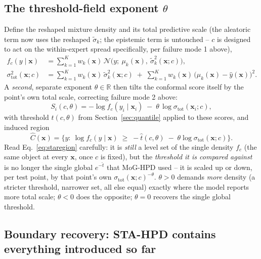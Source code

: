 \documentclass[11pt]{article}
\begin{document}
\subsection{The threshold-field exponent $\theta$}
\label{sec:theta}

Define the reshaped mixture density and its total predictive scale (the aleatoric term now uses
the reshaped $\tilde\sigma_k$; the epistemic term is untouched -- $c$ is designed to act on the
within-expert spread specifically, per failure mode 1 above),
\begin{align}
f_c(y\mid\bm x) &= \sum_{k=1}^K w_k(\bm x)\,\mathcal N\big(y;\ \mu_k(\bm x),\
\tilde\sigma_k^2(\bm x;c)\big), \label{eq:fc}\\
\sigma_{\mathrm{tot}}^2(\bm x;c) &= \sum_{k=1}^K w_k(\bm x)\,\tilde\sigma_k^2(\bm x;c) \;+\;
\sum_{k=1}^K w_k(\bm x)\,\big(\mu_k(\bm x)-\hat y(\bm x)\big)^2. \label{eq:sigmatotc}
\end{align}
A \emph{second}, separate exponent $\theta \in \mathbb R$ then tilts the conformal score itself by
the point's own total scale, correcting failure mode 2 above:
\begin{equation}
S_i(c,\theta) = -\log f_c(y_i\mid\bm x_i) \;-\; \theta\,\log\sigma_{\mathrm{tot}}(\bm x_i;c),
\label{eq:stascore}
\end{equation}
with threshold $\hat t(c,\theta)$ from Section~\ref{sec:quantile} applied to these scores, and
induced region
\begin{equation}
\hat C(\bm x) = \Big\{y :\ \log f_c(y\mid\bm x) \;\ge\; -\hat t(c,\theta) \;-\;
\theta\log\sigma_{\mathrm{tot}}(\bm x;c) \Big\}.
\label{eq:staregion}
\end{equation}
Read Eq.~\eqref{eq:staregion} carefully: it is \emph{still} a level set of the single density
$f_c$ (the same object at every $\bm x$, once $c$ is fixed), but the \emph{threshold it is compared
against} is no longer the single global $e^{-\hat t}$ that MoG-HPD used -- it is scaled up or down,
per test point, by that point's own $\sigma_{\mathrm{tot}}(\bm x;c)^{-\theta}$. $\theta>0$ demands
\emph{more} density (a stricter threshold, narrower set, all else equal) exactly where the model
reports more total scale; $\theta<0$ does the opposite; $\theta=0$ recovers the single global
threshold.

\subsection{Boundary recovery: STA-HPD contains everything introduced so far}
\end{document}
